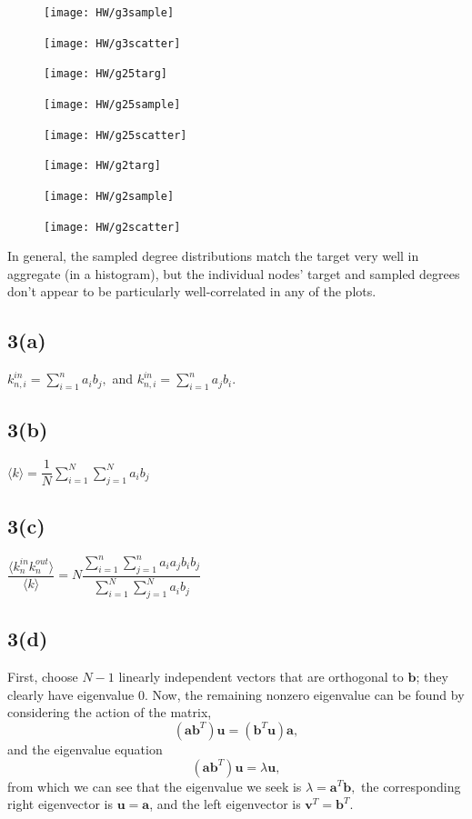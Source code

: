 \documentclass[11pt]{article}
\begin{document}
\begin{figure}[H]
	\texttt{[image: HW/g3sample]}
	\label{fig:g3sample}	
\end{figure}
\begin{figure}[H]
	\texttt{[image: HW/g3scatter]}
	\label{fig:g3scatter}	
\end{figure}
\begin{figure}[H]
	\texttt{[image: HW/g25targ]}
	\label{fig:g25targ}	
\end{figure}
\begin{figure}[H]
	\texttt{[image: HW/g25sample]}
	\label{fig:g25sample}	
\end{figure}
\begin{figure}[H]
	\texttt{[image: HW/g25scatter]}
	\label{fig:g25scatter}	
\end{figure}
\begin{figure}[H]
	\texttt{[image: HW/g2targ]}
	\label{fig:g2targ}	
\end{figure}
\begin{figure}[H]
	\texttt{[image: HW/g2sample]}
	\label{fig:g2sample}	
\end{figure}
\begin{figure}[H]
	\texttt{[image: HW/g2scatter]}
	\label{fig:g2scatter}	
\end{figure}

In general, the sampled degree distributions match the target very well in aggregate (in a histogram), but the individual nodes' target and sampled degrees don't appear to be particularly well-correlated in any of the plots.
\subsection*{3(a)} $k^{in}_{n,i} = \sum\limits_{i=1}^n a_ib_j,$ and $k^{in}_{n,i} = \sum\limits_{i=1}^n a_jb_i.$
\subsection*{3(b)} $\langle k\rangle = \dfrac{1}{N}\sum\limits_{i=1}^N \sum\limits_{j=1}^N a_i b_j$
\subsection*{3(c)} $\dfrac{\langle k^{in}_n k^{out}_n\rangle}{\langle k \rangle}  =  N\dfrac{\sum\limits_{i=1}^n\sum\limits_{j=1}^n a_ia_jb_ib_j}{\sum\limits_{i=1}^N\sum\limits_{j=1}^N a_i b_j}$
\subsection*{3(d)} First, choose $N-1$ linearly independent vectors that are orthogonal to $\bm{b}$; they clearly have eigenvalue 0. Now, the remaining nonzero eigenvalue can be found by considering the action of the matrix,
\[
(\bm{a}\bm{b}^T)\bm{u} = (\bm{b}^T\bm{u})\bm{a},
\]
and the eigenvalue equation
\[
(\bm{a}\bm{b}^T)\bm{u} = \lambda \bm{u},
\]
from which we can see that the eigenvalue we seek is $\lambda = \bm{a}^T\bm{b},$ the corresponding right eigenvector is $\bm{u} = \bm{a}$, and the left eigenvector is $\bm{v}^T = \bm{b}^T$.
\end{document}
